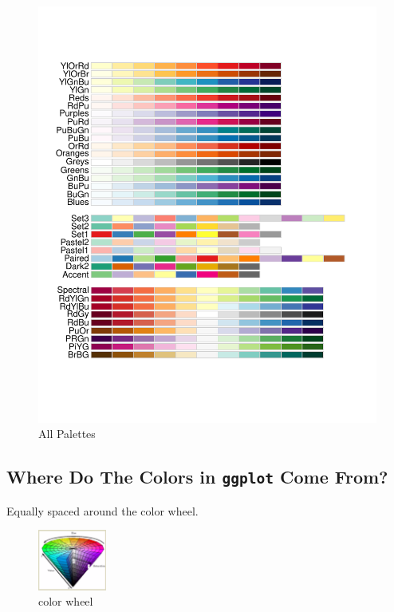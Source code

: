 \documentclass[
]{article}
\begin{document}
\begin{figure}
\centering
\includegraphics{design_files/figure-latex/unnamed-chunk-7-1.pdf}
\caption{All Palettes}
\end{figure}

\newpage

\hypertarget{where-do-the-colors-in-ggplot-come-from}{%
\subsection{\texorpdfstring{Where Do The Colors in \texttt{ggplot} Come
From?}{Where Do The Colors in ggplot Come From?}}\label{where-do-the-colors-in-ggplot-come-from}}

Equally spaced around the color wheel.

\begin{figure}
\centering
\includegraphics[width=0.2\textwidth,height=\textheight]{colorwheel.png}
\caption{color wheel}
\end{figure}
\end{document}
